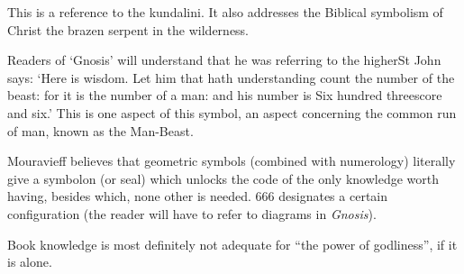 This is a reference to the kundalini. It also addresses the Biblical symbolism of Christ the brazen serpent in the wilderness.

\begin{quotex}
Readers of `Gnosis' will understand that he was referring to the higherSt John says: `Here is wisdom. Let him that hath understanding count the number of the beast: for it is the number of a man: and his number is Six hundred threescore and six.' This is one aspect of this symbol, an aspect concerning the common run of man, known as the Man-Beast.
\end{quotex}

Mouravieff believes that geometric symbols (combined with numerology) literally give a symbolon (or seal) which unlocks the code of the only knowledge worth having, besides which, none other is needed. 666 designates a certain configuration (the reader will have to refer to diagrams in \emph{Gnosis}).

Book knowledge is most definitely not adequate for ``the power of godliness'', if it is alone.

